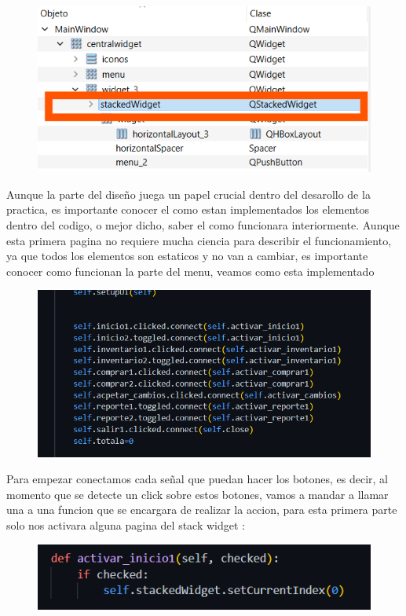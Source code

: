\documentclass[11pt]{article}
\begin{document}
\begin{figure}[H]
		\begin{center}
 			\includegraphics[width = .2\textwidth]{05.png}
 			
		\end{center} 
\end{figure}

Aunque la parte del diseño juega un papel crucial dentro del desarollo de la practica, es importante conocer el como estan implementados los elementos dentro del codigo, o mejor dicho, saber el como funcionara interiormente. Aunque esta primera pagina no requiere mucha ciencia para describir el funcionamiento, ya que todos los elementos son estaticos y no van a cambiar, es importante conocer como funcionan la parte del menu, veamos como esta implementado
\begin{figure}[H]
		\begin{center}
 			\includegraphics[width = .5\textwidth]{07.png}
 			 
 			
		\end{center} 
\end{figure}

Para empezar conectamos cada señal que puedan hacer los botones, es decir, al momento que se detecte un click sobre estos botones, vamos a mandar a llamar una a una funcion que se encargara de realizar la accion, para esta primera parte solo nos activara alguna pagina del stack widget :
\begin{figure}[H]
		\begin{center}
 			\includegraphics[width = .5\textwidth]{08.png}
 			
		\end{center} 
\end{figure}
\end{document}

